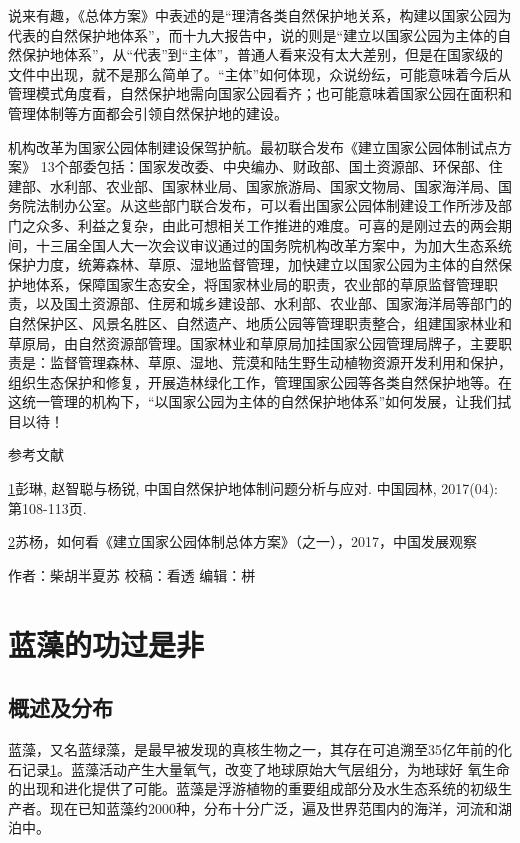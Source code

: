 \documentclass[]{book}
\begin{document}
说来有趣，《总体方案》中表述的是``理清各类自然保护地关系，构建以国家公园为代表的自然保护地体系''，而十九大报告中，说的则是``建立以国家公园为主体的自然保护地体系''，从``代表''到``主体''，普通人看来没有太大差别，但是在国家级的文件中出现，就不是那么简单了。``主体''如何体现，众说纷纭，可能意味着今后从管理模式角度看，自然保护地需向国家公园看齐；也可能意味着国家公园在面积和管理体制等方面都会引领自然保护地的建设。

机构改革为国家公园体制建设保驾护航。最初联合发布《建立国家公园体制试点方案》
13个部委包括：国家发改委、中央编办、财政部、国土资源部、环保部、住建部、水利部、农业部、国家林业局、国家旅游局、国家文物局、国家海洋局、国务院法制办公室。从这些部门联合发布，可以看出国家公园体制建设工作所涉及部门之众多、利益之复杂，由此可想相关工作推进的难度。可喜的是刚过去的两会期间，十三届全国人大一次会议审议通过的国务院机构改革方案中，为加大生态系统保护力度，统筹森林、草原、湿地监督管理，加快建立以国家公园为主体的自然保护地体系，保障国家生态安全，将国家林业局的职责，农业部的草原监督管理职责，以及国土资源部、住房和城乡建设部、水利部、农业部、国家海洋局等部门的自然保护区、风景名胜区、自然遗产、地质公园等管理职责整合，组建国家林业和草原局，由自然资源部管理。国家林业和草原局加挂国家公园管理局牌子，主要职责是：监督管理森林、草原、湿地、荒漠和陆生野生动植物资源开发利用和保护，组织生态保护和修复，开展造林绿化工作，管理国家公园等各类自然保护地等。在这统一管理的机构下，``以国家公园为主体的自然保护地体系''如何发展，让我们拭目以待！

参考文献

\href{陈心想，耿增超。西北农林科技大学学报（自然科学版），2013，41:\%20167-174．}{1}彭琳,
赵智聪与杨锐, 中国自然保护地体制问题分析与应对. 中国园林, 2017(04):
第108-113页.

\href{Kezhen\%20Qian,\%20Ajay\%20Kumar,\%20et.al.\%20Renew.\%20and\%20Sustain.\%20Energy\%20Reviews,\%202015,\%2042:\%201055-1064.}{2}苏杨，如何看《建立国家公园体制总体方案》（之一），2017，中国发展观察

作者：柴胡半夏苏 校稿：看透 编辑：栟

\section{蓝藻的功过是非}

\subsection{概述及分布}

蓝藻，又名蓝绿藻，是最早被发现的真核生物之一，其存在可追溯至35亿年前的化石记录\href{陈心想，耿增超。西北农林科技大学学报（自然科学版），2013，41:\%20167-174．}{1}。蓝藻活动产生大量氧气，改变了地球原始大气层组分，为地球好
氧生命的出现和进化提供了可能。蓝藻是浮游植物的重要组成部分及水生态系统的初级生产者。现在已知蓝藻约2000种，分布十分广泛，遍及世界范围内的海洋，河流和湖泊中。
\end{document}
